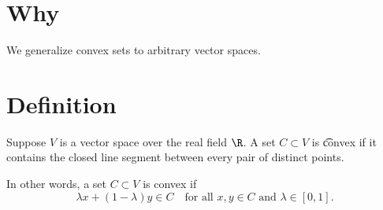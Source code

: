 
\section*{Why}

We generalize convex sets to arbitrary vector spaces.

\section*{Definition}

Suppose $V$ is a vector space over the real field $\R $.
A set $C \subset V$ is \t{convex} if it contains the closed line segment between every pair of distinct points.

In other words, a set $C \subset V$ is convex if
\[
\lambda x + (1-\lambda )y \in C \quad \text{for all } x, y \in C \text{ and } \lambda  \in [0,1].
\]

\blankpage